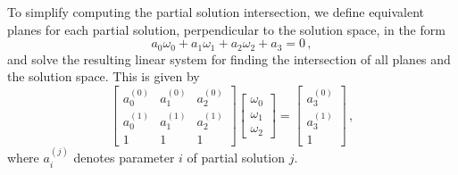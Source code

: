 \documentclass[letterpaper, 10 pt, conference]{ieeeconf}  %
\begin{document}
To simplify computing the partial solution intersection, we define equivalent planes for each partial solution, perpendicular to the solution space, in the form
\begin{equation}
   a_0\omega_0 + a_1\omega_1 +a_2\omega_2 + a_3 = 0\,, \label{eqn:3sen_plane_eq}
\end{equation}
and solve the resulting linear system for finding the intersection of all planes and the solution space. This is given by
\begin{equation}
   \begin{bmatrix}
      a_0^{(0)} & a_1^{(0)} & a_2^{(0)} \\
      a_0^{(1)} & a_1^{(1)} & a_2^{(1)} \\
      1 & 1 & 1
   \end{bmatrix}
   \begin{bmatrix}
      \omega_0 \\
      \omega_1 \\
      \omega_2
   \end{bmatrix}
   =
   \begin{bmatrix}
      a_3^{(0)} \\
      a_3^{(1)} \\
      1
   \end{bmatrix}\,, \label{eqn:3sen_plane_sol_eq}
\end{equation}
where $a_i^{(j)}$ denotes parameter $i$ of partial solution $j$.
\end{document}
